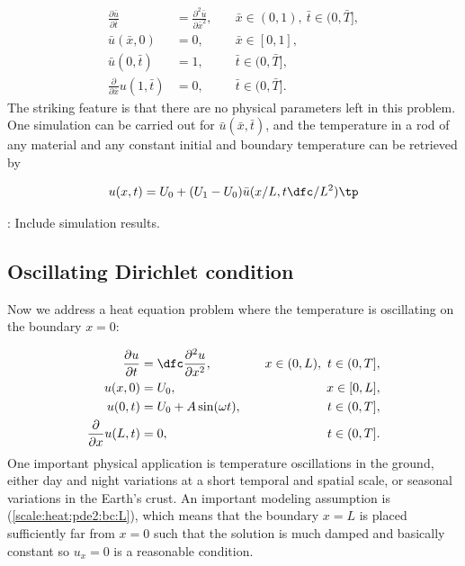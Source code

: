 \documentclass[graybox,envcountchap,sectrefs,final]{svmonodo}
\newcommand{\shortinlinecomment}[3]{{\color{red}{\bf #1}: #2}}
\begin{document}
\begin{align}
\frac{\partial \bar u}{\partial \bar t} &=
\frac{\partial^2 \bar u}{\partial \bar x^2},
\quad &  \bar x\in (0,1),\ \bar t\in (0, \bar T],
\label{scale:heat:pde3:d}\\ 
\bar u(\bar x,0) &= 0,
\quad & \bar x\in [0,1],
\label{scale:heat:pde3:ic:u:d}\\ 
\bar u(0, \bar t) & = 1,
\quad  & \bar t\in (0, \bar T],
\label{scale:heat:pde3:bc:0:d}\\ 
\frac{\partial}{\partial \bar x} u(1, \bar t) & = 0,
\quad & \bar t\in (0, \bar T].
\label{scale:heat:pde3:bc:L:d}
\end{align}
The striking feature is that there are no physical parameters left in
this problem. One simulation can be carried out for $\bar u(\bar x,\bar t)$,
and the temperature in a rod of any material and any constant initial and
boundary temperature can be retrieved by

\[ u(x,t) = U_0 + (U_1-U_0)\bar u(x/L, t\dfc/L^2)\tp\]

\shortinlinecomment{hpl 2}{ Include simulation results. }{ Include simulation results. }

\subsection{Oscillating Dirichlet condition}

Now we address a heat equation problem where the temperature is
oscillating on the boundary $x=0$:

\begin{align}
\frac{\partial u}{\partial t} &=
\dfc \frac{\partial^2 u}{\partial x^2},
\quad &  x\in (0,L),\ t\in (0, T],
\label{scale:heat:pde2}\\ 
u(x,0) &= U_0,
\quad & x\in [0,L],
\label{scale:heat:pde2:ic:u}\\ 
u(0, t) & = U_0 + A\sin(\omega t),
\quad  & t\in (0, T],
\label{scale:heat:pde2:bc:0}\\ 
\frac{\partial}{\partial x} u(L, t) & = 0,
\quad & t\in (0, T].
\label{scale:heat:pde2:bc:L}
\end{align}
One important physical application is temperature oscillations in the
ground, either day and night variations
at a short temporal and spatial scale, or seasonal variations in the
Earth's crust.
An important modeling assumption is (\ref{scale:heat:pde2:bc:L}),
which means that the boundary $x=L$ is placed sufficiently far from $x=0$
such that the solution is much damped and basically constant so
$u_x=0$ is a reasonable condition.
\end{document}
